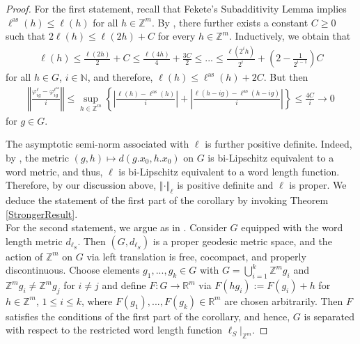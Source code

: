 \documentclass[a4paper,11pt,reqno]{amsart}
\numberwithin{equation}{section}
\numberwithin{equation}{section}
\theoremstyle{definition}
\theoremstyle{remark}
\theoremstyle{remark}
\begin{document}
\begin{proof} For the first statement, recall that Fekete's Subadditivity
Lemma implies $\ell^{\text{as}}(h)\leq\ell(h)$ for all $h\in\mathbb{Z}^{m}$.
By \cite[Lemma 20]{LOZ21}, there further exists a constant $C\geq0$
such that $2\ell(h)\leq\ell(2h)+C$ for every $h\in\mathbb{Z}^{m}$.
Inductively, we obtain that
\begin{eqnarray}
\nonumber
\ell(h)\leq\frac{\ell(2h)}{2}+C\leq\frac{\ell(4h)}{4}+\frac{3C}{2}\leq...\leq\frac{\ell(2^{i}h)}{2^{i}}+\left(2-\frac{1}{2^{i-1}}\right)C
\end{eqnarray}
for all $h\in G$, $i\in\mathbb{N}$, and therefore, $\ell(h)\leq\ell^{\text{as}}(h)+2C$.
But then
\begin{eqnarray}
\nonumber
\left\Vert \frac{\varphi_{ig}^{\ell}-\varphi_{ig}^{\ell^{\text{as}}}}{i}\right\Vert \leq \sup_{h\in\mathbb{Z}^{m}}\left\{ \left|\frac{\ell(h)-\ell^{\text{as}}(h)}{i}\right|+\left|\frac{\ell(h-ig)-\ell^{\text{as}}(h-ig)}{i}\right|\right\} \leq\frac{4C}{i}\rightarrow0
\end{eqnarray}
for $g\in G$.

The asymptotic semi-norm associated with $\ell$ is further
positive definite. Indeed, by \cite[Theorem 8.3.19]{BBI01}, the metric
$(g,h)\mapsto d(g.x_{0},h.x_{0})$ on $G$ is bi-Lipschitz equivalent
to a word metric, and thus, $\ell$ is bi-Lipschitz equivalent to a
word length function. Therefore, by our discussion above, $\left\Vert \cdot\right\Vert _{\ell}$
is positive definite and $\ell$ is proper. We deduce the statement
of the first part of the corollary by invoking Theorem \ref{StrongerResult}. \\

For the second statement, we argue as in \cite[Corollary 23]{LOZ21}.
Consider $G$ equipped with the word length metric $d_{\ell_S}$. Then
$(G,d_{\ell_S})$ is a proper geodesic metric space, and the action of $\mathbb{Z}^{m}$
on $G$ via left translation is free, cocompact, and properly discontinuous.
Choose elements $g_{1},...,g_{k}\in G$ with $G=\bigcup_{i=1}^{k}\mathbb{Z}^{m}g_{i}$
and $\mathbb{Z}^{m}g_{i}\neq\mathbb{Z}^{m}g_{j}$ for $i\neq j$ and
define $F:G\rightarrow\mathbb{R}^{m}$ via $F(hg_{i}):=F(g_{i})+h$
for $h\in\mathbb{Z}^{m}$, $1\leq i\leq k$, where $F(g_{1}),...,F(g_{k})\in\mathbb{R}^{m}$
are chosen arbitrarily. Then $F$ satisfies the conditions of the
first part of the corollary, and hence, $G$ is separated with respect
to the restricted word length function $\ell_{S}|_{\mathbb{Z}^{m}}$.
\end{proof}
\end{document}
